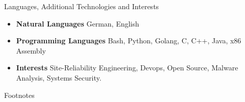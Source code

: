 \documentclass[]{mcdowellcv}
\begin{document}
\begin{cvsection}{Languages, Additional Technologies and Interests}
\begin{cvsubsection}{}{}{}
\begin{itemize}
\item \textbf{Natural Languages} German, English
\item \textbf{Programming Languages} Bash, Python, Golang, C, C++, Java, x86 Assembly
\item \textbf{Interests} Site-Reliability Engineering, Devops, Open Source,  Malware Analysis, Systems Security.
\end{itemize}
\end{cvsubsection}
\end{cvsection}

\begin{cvsection}{Footnotes}
\theendnotes
\end{cvsection}
\end{document}
